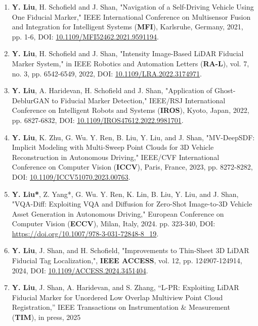 
\begin{enumerate}
    \item \textbf{Y. Liu}, H. Schofield and J. Shan, "Navigation of a Self-Driving Vehicle Using One Fiducial Marker," IEEE International Conference on Multisensor Fusion and Integration for Intelligent Systems (\textbf{MFI}), Karlsruhe, Germany, 2021, pp. 1-6, 
    DOI: \url{10.1109/MFI52462.2021.9591194}. 
    
    \item \textbf{Y. Liu}, H. Schofield and J. Shan, "Intensity Image-Based LiDAR Fiducial Marker System," in IEEE Robotics and Automation Letters (\textbf{RA-L}), vol. 7, no. 3, pp. 6542-6549, 2022, DOI: \url{10.1109/LRA.2022.3174971}. 
    
    \item \textbf{Y. Liu}, A. Haridevan, H. Schofield and J. Shan, "Application of Ghost-DeblurGAN to Fiducial Marker Detection," IEEE/RSJ International Conference on Intelligent Robots and Systems (\textbf{IROS}), Kyoto, Japan, 2022, pp. 6827-6832, DOI: \url{10.1109/IROS47612.2022.9981701}.

    \item \textbf{Y. Liu}, K. Zhu, G. Wu. Y. Ren, B. Liu, Y. Liu, and J. Shan, "MV-DeepSDF: Implicit Modeling with Multi-Sweep Point Clouds for 3D Vehicle Reconstruction in Autonomous Driving," IEEE/CVF International Conference on Computer Vision (\textbf{ICCV}), Paris, France, 2023, pp. 8272-8282, DOI: \url{10.1109/ICCV51070.2023.00763}.  

    \item \textbf{Y. Liu*}, Z. Yang*, G. Wu. Y. Ren, K. Lin, B. Liu, Y. Liu, and J. Shan, "VQA-Diff: Exploiting VQA and Diffusion for Zero-Shot Image-to-3D Vehicle Asset Generation in Autonomous Driving," European Conference on Computer Vision (\textbf{ECCV}), Milan, Italy, 2024. pp. 323-340, DOI: \url{https://doi.org/10.1007/978-3-031-72848-8_19}.  

    \item \textbf{Y. Liu}, J. Shan, and H. Schofield, "Improvements to Thin-Sheet 3D LiDAR Fiducial Tag Localization,", \textbf{IEEE ACCESS}, vol. 12, pp. 124907-124914, 2024, DOI: \url{10.1109/ACCESS.2024.3451404}. 

    \item \textbf{Y. Liu}, J. Shan, A. Haridevan, and S. Zhang, “L-PR: Exploiting LiDAR Fiducial Marker for Unordered Low Overlap Multiview Point Cloud Registration,” IEEE Transactions on Instrumentation \& Measurement (\textbf{TIM}), in press, 2025


\end{enumerate}
